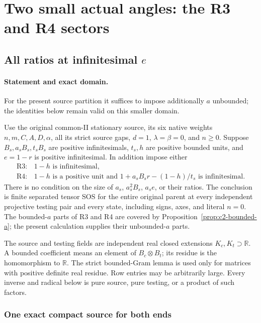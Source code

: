 \section{Two small actual angles: the R3 and R4 sectors}
\subsection{All ratios at infinitesimal $e$}
\label{component:p1de8b5ffab69}

\label{p1de8b5ffab69:sec:new-r34-all-tests}

\paragraph{Statement and exact domain.}
For the present source partition it suffices to impose additionally $a$ unbounded; the identities below remain valid on this smaller domain.

Use the original common-II stationary source, its six native weights
$n,m,C,A,D,\alpha$, all its strict source gaps, $d=1$,
$\lambda=\beta=0$, and $n\geq0$. Suppose $B_s,a_sB_s,t_sB_s$
are positive infinitesimals, $t_s,h$ are positive bounded units,
and $e=1-r$ is positive infinitesimal. In addition impose either
\[
 \begin{array}{ll}
 \mathrm{R3}:&1-h\text{ is infinitesimal},\\
 \mathrm{R4}:&1-h\text{ is a positive unit and }
       1+a_sB_sr-(1-h)/t_s\text{ is infinitesimal}.
 \end{array}                                                    \tag{EN1}
\]
There is no condition on the size of $a_s$, $a_s^2B_s$,
$a_s e$, or their ratios. The conclusion is finite separated tensor
SOS for the entire original parent at every independent projective
testing pair and every state, including signs, axes, and literal $n=0$.
The bounded-$a$ parts of R3 and R4 are covered by Proposition~\ref{prop:c2-bounded-a}; the present calculation supplies their unbounded-$a$ parts.

The source and testing fields are independent real closed extensions
$K_c,K_t\supset\mathbb R$. A bounded coefficient means an element
of $B_c\otimes B_t$; its residue is the homomorphism to $\mathbb R$.
The strict bounded-Gram lemma is used only for matrices with positive
definite real residue. Row entries may be arbitrarily large.
Every inverse and radical below is pure source, pure testing, or a
product of such factors.

\subsubsection*{One exact compact source for both ends}

